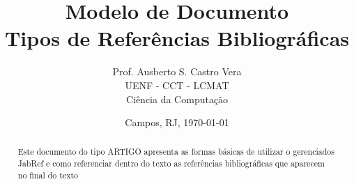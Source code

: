 \documentclass[12pt]{article}
\title{\bf Modelo de Documento \\  Tipos de Refer\^{e}ncias Bibliogr\'{a}ficas}
\author{\textsf{Prof. Ausberto S. Castro Vera} \\
	            UENF - CCT - LCMAT \\
	            Ci\^{e}ncia da Computa\c{c}\~{a}o
	   }
\date{Campos, RJ, \today}    %
\begin{document}
\maketitle     %


\begin{abstract}
Este documento do tipo ARTIGO apresenta as formas b\'{a}sicas de utilizar o gerenciados JabRef e como referenciar dentro do texto as refer\^{e}ncias bibliogr\'{a}ficas que aparecem no final do texto
\end{abstract}

\newpage
{}
\tableofcontents
\newpage





\end{document}
